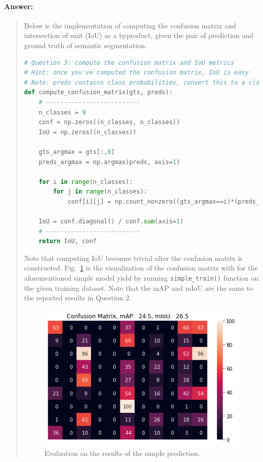 \documentclass[9pt]{article}
\begin{document}
\paragraph{Answer:} 
\begin{quote}

Below is the implementation of computing the confusion matrix and intersection of unit (IoU) as a byproduct, given the pair of prediction and ground truth of semantic segmentation. 

\begin{lstlisting}[language=Python, basicstyle=\scriptsize]
# Question 3: compute the confusion matrix and IoU metrics
# Hint: once you've computed the confusion matrix, IoU is easy
# Note: preds contains class probabilities, convert this to a class prediction
def compute_confusion_matrix(gts, preds):
    # --------------------------
    n_classes = 9
    conf = np.zeros((n_classes, n_classes))
    IoU = np.zeros((n_classes))
    
    gts_argmax = gts[:,0]
    preds_argmax = np.argmax(preds, axis=1)

    for i in range(n_classes):
        for j in range(n_classes):
            conf[i][j] = np.count_nonzero((gts_argmax==i)*(preds_argmax==j))
    
    IoU = conf.diagonal() / conf.sum(axis=1)
    # --------------------------
    return IoU, conf
\end{lstlisting}

Note that computing IoU becomes trivial after the confusion matrix is constructed. Fig.~\ref{fig:eval-simple-predict} is the visualization of the confusion matrix with for the aforementioned simple model yield by running \texttt{simple\_train()} function on the given training dataset. Note that the mAP and mIoU are the same to the reported results in Question 2.

\begin{figure}[h]
    \centering
    \includegraphics[width=0.5\linewidth]{eval_simple_predict.png}
    \caption{Evaluation on the results of the simple prediction.}
    \label{fig:eval-simple-predict}
\end{figure}

\end{quote}
\end{document}
